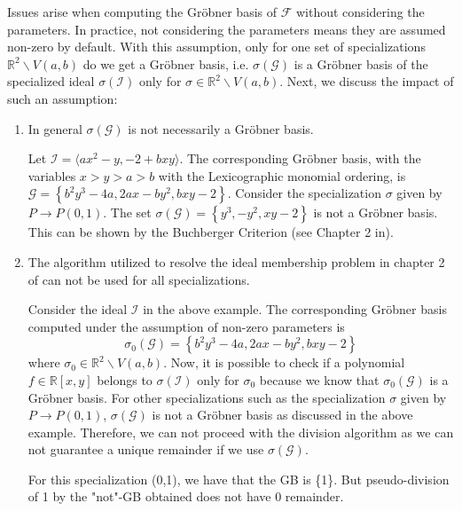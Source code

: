 \documentclass[runningheads]{llncs}
\newcommand{\Rr}{\mathbb{R}}
\newcommand{\1}{\chi}
\newcommand{\Ff}{\mathcal{F}}
\newcommand{\Gg}{\mathcal{G}}
\newcommand{\Ii}{\mathcal{I}}
\begin{document}
Issues arise when computing the Gr{\"o}bner basis of $\Ff$ without considering the parameters.
In practice, not considering the parameters means they are assumed non-zero by default.
With this assumption, only for one set of specializations  $\Rr^2\backslash V(a,b)$ do we get a Gr{\"o}bner basis, i.e. 
$\sigma(\Gg)$ is a Gr{\"o}bner basis of the specialized ideal $\sigma(\Ii)$ only for $\sigma \in \Rr^2\backslash V(a,b)$.
Next, we discuss the impact of such an assumption:
\begin{enumerate}
    \item In general $\sigma\left(\Gg\right)$ is not necessarily a Gr{\"o}bner basis.
    \begin{example}
        \label{ex431}
        Let $\Ii=\langle 
           {a x^2 - y, -2 + b x y} \rangle$. The corresponding Gr{\"o}bner basis, with the variables $x>y>a>b$ with the Lexicographic monomial ordering, 
           is $\Gg=\left\{b^2 y^3-4 a,2 a x-b y^2,b x y-2\right\}$. Consider 
           the specialization $\sigma$ given by $P\rightarrow P(0,1)$.
           The set $\sigma(\Gg)=\left\{y^3,-y^2,x y-2\right\}$ is not a Gr{\"o}bner basis.
		   This can be shown by the Buchberger Criterion (see Chapter 2 in\cite{Cox}).

    \end{example}
    \item The algorithm utilized to resolve the ideal membership 
    problem in chapter 2 of \cite{Cox} can not be used for all specializations. 
    
    \begin{example}
        \label{ex433}
        Consider the ideal $\Ii$ in the above example. The corresponding Gr{\"o}bner basis computed under the assumption of non-zero parameters
        is $$\sigma_0(\Gg)=\left\{b^2 y^3-4 a,2 a x-b y^2,b x y-2\right\}$$ where $\sigma_0 \in \Rr^2\backslash V(a,b)$. 
        Now, it is possible to check if a polynomial $f\in \Rr[x,y]$ belongs to $\sigma(\Ii)$ only for $\sigma_0 $     
        because we know that $\sigma_0(\Gg)$ is a Gr{\"o}bner basis. For other specializations such as 
        the specialization $\sigma$ given by $P\rightarrow P(0,1)$, $\sigma(\Gg)$ is not a Gr{\"o}bner basis as discussed in the above example. 
        Therefore, we can not proceed with the division algorithm as we can not guarantee a unique remainder if we use $\sigma(\Gg)$.  
    \end{example}

	{\color{blue} For this specialization (0,1), we have that the GB is \{1\}. But pseudo-division of 1 by the "not"-GB obtained does not have 0 remainder.}


\end{enumerate}
\end{document}
